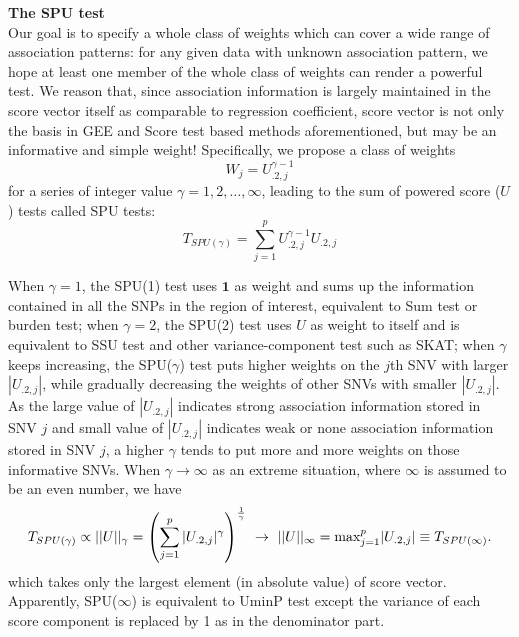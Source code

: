 \documentclass[12pt]{article}
\begin{document}
\textbf{The SPU test}\\
Our goal is to specify a whole class of weights which can cover a wide range of association patterns: for any given data with unknown association pattern, we hope at least one member of the whole class of weights can render a powerful test. We reason that, since association information is largely maintained in the score vector itself as comparable to regression coefficient, score vector is not only the basis in GEE and Score test based methods aforementioned, but may be an informative and simple weight! Specifically, we propose a class of weights 
$$W_j = U_{.2, j} ^ { \gamma - 1} $$
for a series of integer value $\gamma = 1,2,\ldots,\infty$, leading to the sum of powered score ($U$) tests called SPU tests:
$$
T_{ SPU ( \gamma ) } = \sum_{j=1}^p U_{.2, j} ^ { \gamma - 1} U_{.2, j}
$$

When $\gamma = 1$, the SPU(1) test uses $\textbf{1}$ as weight and sums up the information contained in all the SNPs in the region of interest, equivalent to Sum test or burden test; when $\gamma = 2$, the SPU(2) test uses $U$ as weight to itself and is equivalent to SSU test and other variance-component test such as SKAT; when $\gamma$ keeps increasing, the SPU($\gamma$) test puts higher weights on the $j$th SNV with larger $|U_{.2,j}|$, while gradually decreasing the weights of other SNVs with smaller $|U_{.2,j}|$. As the large value of $|U_{.2,j}|$ indicates strong association information stored in SNV $j$ and small value of $|U_{.2,j}|$ indicates weak or none association information stored in SNV $j$, a higher $\gamma$ tends to put more and more weights on those informative SNVs. When $\gamma \rightarrow \infty$ as an extreme situation, where $\infty$ is assumed to be an even number, we have
$$
T_{ SPU(\gamma) } \propto ||U||_{\gamma} = \left( \sum_{j=1}^p |U_{.2, j}| ^ { \gamma } \right) ^ { 1 \over \gamma } \ \rightarrow \ ||U||_{\infty} = \textrm{max}_{j=1} ^ p |U_{.2, j}| \equiv T_{ SPU(\infty) }.
$$ 
which takes only the largest element (in absolute value) of score vector. Apparently, SPU($\infty$) is equivalent to UminP test except the variance of each score component is replaced by 1 as in the denominator part.
\end{document}
